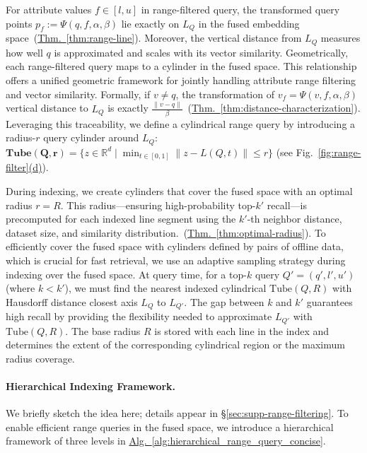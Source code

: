 \documentclass[numbers,sort]{article}
\begin{document}
For attribute values \(f \in [l, u]\) in range-filtered query, the transformed query points $p_f := \Psi(q, f, \alpha, \beta)$ lie exactly on $L_Q$ in the fused embedding space~(\hyperref[thm:range-line]{Thm.~\ref*{thm:range-line}}). Moreover, the vertical distance from \(L_Q\) measures how well \(q\) is approximated and scales with its vector similarity. Geometrically, each range-filtered query maps to a cylinder in the fused space. This relationship offers a unified geometric framework for jointly handling attribute range filtering and vector similarity. Formally, if $v\neq q$, the transformation of $v_f = \Psi(v, f, \alpha, \beta)$ vertical distance to $L_Q$ is exactly $\frac{\|v - q\|}{\beta}$~(\hyperref[thm:distance-characterization]{Thm.~\ref*{thm:distance-characterization}}). Leveraging this traceability, we define a cylindrical range query by introducing a radius-\(r\) query cylinder around \(L_Q\): \(\mathbf{Tube}\mathbf{(Q, r)} = \{ z \in \mathbb{R}^d \mid \min_{t \in [0,1]} \| z - L(Q, t) \| \le r \}\) (see Fig.~\hyperref[fig:range-filter]{\ref*{fig:range-filter}(d)}).

During indexing, we create cylinders that cover the fused space with an optimal radius \(r = R\). This radius—ensuring high-probability top-\(k'\) recall—is precomputed for each indexed line segment using the \(k'\)-th neighbor distance, dataset size, and similarity distribution.~(\hyperref[thm:optimal-radius]{Thm.~\ref*{thm:optimal-radius}}). To efficiently cover the fused space with cylinders defined by pairs of offline data, which is crucial for fast retrieval, we use an adaptive sampling strategy during indexing over the fused space. At query time, for a top-\(k\) query \(Q' = (q', l', u')\) (where $k<k'$), we must find the nearest indexed cylindrical $\text{Tube}(Q, R)$ with Hausdorff distance closest axis $L_Q$ to $L_{Q'}$. The gap between \(k\) and \(k'\) guarantees high recall by providing the flexibility needed to approximate \(L_{Q'}\) with \(\text{Tube}(Q, R)\). The base radius $R$ is stored with each line in the index and determines the extent of the corresponding cylindrical region or the maximum radius coverage. 


\paragraph{Hierarchical Indexing Framework.}
We briefly sketch the idea here; details appear in \hyperref[sec:supp-range-filtering]{\S\ref*{sec:supp-range-filtering}}. To enable efficient range queries in the fused space, we introduce a hierarchical framework of three levels in \hyperref[alg:hierarchical_range_query_concise]{Alg.~\ref*{alg:hierarchical_range_query_concise}}. 
\end{document}
